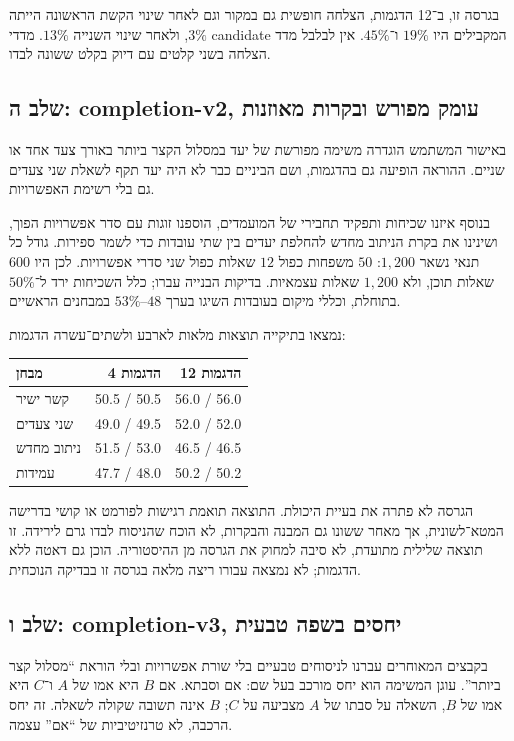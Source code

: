 \documentclass[11pt,a4paper]{article}
\newcommand{\en}[1]{\textenglish{#1}}
\begin{document}
בגרסה זו, ב־12 הדגמות, הצלחה חופשית גם במקור וגם לאחר שינוי הקשת הראשונה הייתה $3\%$, ולאחר שינוי השנייה $13\%$. מדדי \en{candidate} המקבילים היו $19\%$ ו־$45\%$. אין לבלבל מדד הצלחה בשני קלטים עם דיוק בקלט ששונה לבדו.

\subsection{שלב ה: completion-v2, עומק מפורש ובקרות מאוזנות}
באישור המשתמש הוגדרה משימה מפורשת של יעד במסלול הקצר ביותר באורך צעד אחד או שניים. ההוראה הופיעה גם בהדגמות, ושם הביניים כבר לא היה יעד תקף לשאלת שני צעדים גם בלי רשימת האפשרויות.

בנוסף איזנו שכיחות ותפקיד תחבירי של המועמדים, הוספנו זוגות עם סדר אפשרויות הפוך, ושינינו את בקרת הניתוב מחדש להחלפת יעדים בין שתי עובדות כדי לשמר ספירות. גודל כל תנאי נשאר $1{,}200$: $50$ משפחות כפול $12$ שאלות כפול שני סדרי אפשרויות. לכן היו $600$ שאלות תוכן, ולא $1{,}200$ שאלות עצמאיות. בדיקות הבנייה עברו; כלל השכיחות ירד ל־$50\%$ בתוחלת, וכללי מיקום בעובדות השיגו בערך $48$--$53\%$ במבחנים הראשיים.

נמצאו בתיקייה תוצאות מלאות לארבע ולשתים־עשרה הדגמות:
\begin{center}\small
\begin{tabular}{lrr}
\toprule
מבחן & 4 הדגמות & 12 הדגמות\\\midrule
קשר ישיר & \en{50.5 / 50.5} & \en{56.0 / 56.0}\\
שני צעדים & \en{49.0 / 49.5} & \en{52.0 / 52.0}\\
ניתוב מחדש & \en{51.5 / 53.0} & \en{46.5 / 46.5}\\
עמידות & \en{47.7 / 48.0} & \en{50.2 / 50.2}\\\bottomrule
\end{tabular}
\end{center}
הגרסה לא פתרה את בעיית היכולת. התוצאה תואמת רגישות לפורמט או קושי בדרישה המטא־לשונית, אך מאחר ששונו גם המבנה והבקרות, לא הוכח שהניסוח לבדו גרם לירידה. זו תוצאה שלילית מתועדת, לא סיבה למחוק את הגרסה מן ההיסטוריה. הוכן גם דאטה ללא הדגמות; לא נמצאה עבורו ריצה מלאה בגרסה זו בבדיקה הנוכחית.

\subsection{שלב ו: completion-v3, יחסים בשפה טבעית}
בקבצים המאוחרים עברנו לניסוחים טבעיים בלי שורת אפשרויות ובלי הוראת ``מסלול קצר ביותר''. עוגן המשימה הוא יחס מורכב בעל שם: אם וסבתא. אם $B$ היא אמו של $A$ ו־$C$ היא אמו של $B$, השאלה על סבתו של $A$ מצביעה על $C$; $B$ אינה תשובה שקולה לשאלה. זה יחס הרכבה, לא טרנזיטיביות של ``אם'' עצמה.
\end{document}
